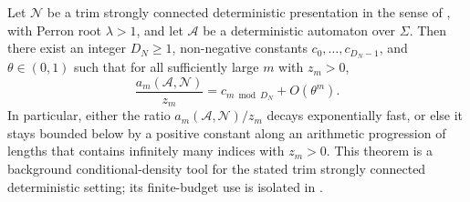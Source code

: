 \begin{theorem}
  \label{thm:parry-density}
  Let \(\mathcal N\) be a trim strongly connected deterministic
  presentation in the sense of
  , with Perron root
  \(\lambda>1\), and let
  \(\mathcal A\) be a deterministic automaton over \(\Sigma\). Then
  there exist an integer \(D_N\ge 1\), non-negative constants
  \(c_0,\dots,c_{D_N-1}\), and \(\theta\in(0,1)\) such that for all
  sufficiently large \(m\) with \(z_m>0\),
  \[
    \frac{a_m(\mathcal A,\mathcal N)}{z_m}
    =c_{m\bmod D_N}+O(\theta^m).
  \]
  In particular, either the ratio
  \(a_m(\mathcal A,\mathcal N)/z_m\) decays exponentially fast, or else
  it stays bounded below by a positive constant along an arithmetic
  progression of lengths that contains infinitely many indices with
  \(z_m>0\).
  This theorem is a background conditional-density tool for the stated
  trim strongly connected deterministic setting; its finite-budget use is
  isolated in
  .
\end{theorem}

